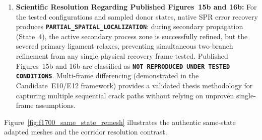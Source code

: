 \begin{enumerate}
\begin{itemize}
    \item \textbf{Post-Severance Relaxation in the Primary Corridor:} At State~4, because the primary crack has already pierced into the central void and its ligament has severed, stresses in the primary path have relaxed ($0.01\%$ of peak error; $h_{\min} = 0.1608\,\mathrm{mm} > \ell_0/2$, $h_{\mathrm{med}} = 0.4091\,\mathrm{mm}$, and \textbf{EXACTLY $\mathbf{0.00\%} \le \ell_0/2$}).
    \item \textbf{State~2 Donor (Hole Arrest, $u_y = 0.200\,\mathrm{mm}$):} Produces an $8{,}363$-element mesh (\texttt{PK\_SEC43\_F1700\_NATIVE\_ADAPT\_STATE2.inp}). The primary corridor is partially refined ($40.0\% \le \ell_0$), but because the secondary crack has not yet initiated, the right ligament carries only smooth far-field stress, yielding \textbf{$0.00\% \le \ell_0$} and \textbf{$0.00\% \le \ell_0/2$} ($h_{\mathrm{med}} = 0.6163\,\mathrm{mm}$).
    \item \textbf{State~5 Donor (Terminal Dual Severance, $u_y = 1.500\,\mathrm{mm}$):} Produces an $8{,}496$-element mesh (\texttt{PK\_SEC43\_F1700\_NATIVE\_ADAPT\_STATE5.inp}), where secondary elements refine to $91.48\% \le \ell_0$ ($17.23\% \le \ell_0/2$), while the primary corridor remains relaxed ($0.00\% \le \ell_0/2$).
  \end{itemize}
  \item \textbf{Scientific Resolution Regarding Published Figures~15b and 16b:}
  For the tested configurations and sampled donor states, native SPR error recovery produces \textbf{\texttt{PARTIAL\_SPATIAL\_LOCALIZATION}}: during secondary propagation (State~4), the active secondary process zone is successfully refined, but the severed primary ligament relaxes, preventing simultaneous two-branch refinement from any single physical recovery frame tested. Published Figures~15b and 16b are classified as \textbf{\texttt{NOT REPRODUCED UNDER TESTED CONDITIONS}}. Multi-frame differencing (demonstrated in the Candidate~E10/E12 framework) provides a validated thesis methodology for capturing multiple sequential crack paths without relying on unproven single-frame assumptions.
\end{enumerate}
Figure~\ref{fig:f1700_same_state_remesh} illustrates the authentic same-state adapted meshes and the corridor resolution contrast.

